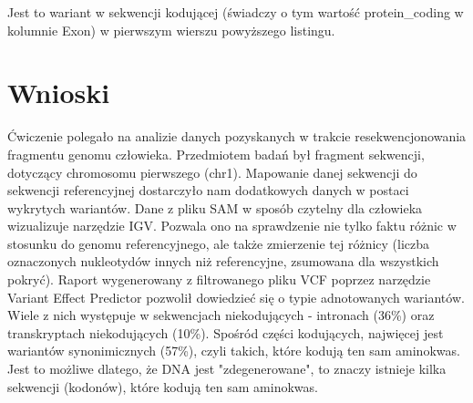 \documentclass[a4paper]{article}
\begin{document}
Jest to wariant w sekwencji kodującej (świadczy o tym wartość protein\_coding w kolumnie Exon) w pierwszym wierszu powyższego listingu.
\section{Wnioski}
Ćwiczenie polegało na analizie danych pozyskanych w trakcie resekwencjonowania fragmentu genomu człowieka. Przedmiotem badań był fragment sekwencji, dotyczący chromosomu pierwszego (chr1). Mapowanie danej sekwencji do sekwencji referencyjnej dostarczyło nam dodatkowych danych w postaci wykrytych wariantów. Dane z pliku SAM w sposób czytelny dla człowieka wizualizuje narzędzie IGV. Pozwala ono na sprawdzenie nie tylko faktu różnic w stosunku do genomu referencyjnego, ale także zmierzenie tej różnicy (liczba oznaczonych nukleotydów innych niż referencyjne, zsumowana dla wszystkich pokryć). Raport wygenerowany z filtrowanego pliku VCF poprzez narzędzie Variant Effect Predictor pozwolił dowiedzieć się o typie adnotowanych wariantów. Wiele z nich występuje w sekwencjach niekodujących - intronach (36\%) oraz transkryptach niekodujących (10\%). Spośród części kodujących, najwięcej jest wariantów synonimicznych (57\%), czyli takich, które kodują ten sam aminokwas. Jest to możliwe dlatego, że DNA jest "zdegenerowane", to znaczy istnieje kilka sekwencji (kodonów), które kodują ten sam aminokwas.
\end{document}
